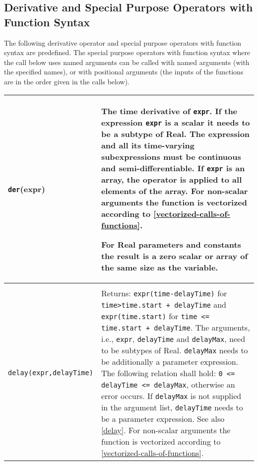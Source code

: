 \subsection{Derivative and Special Purpose Operators with Function Syntax}

The following derivative operator and special purpose operators with
function syntax are predefined. The special purpose operators with
function syntax where the call below uses named arguments can be called
with named arguments (with the specified names), or with positional
arguments (the inputs of the functions are in the order given in the
calls below).

\begin{longtable}{|p{5.1cm}|p{8cm}|}
\hline \endhead

\lstinline!der!(expr) &
The time derivative of \lstinline!expr!. If the expression \lstinline!expr! is a
scalar it needs to be a subtype of Real. The expression and all its
time-varying subexpressions must be continuous and semi-differentiable.
If \lstinline!expr! is an array, the operator
is applied to all elements of the array. For non-scalar arguments the
function is vectorized according to \autoref{vectorized-calls-of-functions}.
\par
\begin{nonnormative*}
For Real parameters and constants the result is a zero scalar or array of the same size as the variable.
\end{nonnormative*}
\\
\hline

\begin{tabular}{@{}p{5.1cm}@{}}

\lstinline!delay(expr,delayTime,delayMax)!\\
\lstinline!delay(expr,delayTime)!
\end{tabular} &
Returns: \lstinline!expr(time-delayTime)! for \lstinline!time>time.start + delayTime! and \lstinline!expr(time.start)! for \lstinline!time <= time.start + delayTime!. The arguments, i.e., \lstinline!expr!, \lstinline!delayTime! and \lstinline!delayMax!, need to be
subtypes of Real. \lstinline!delayMax! needs to be additionally a parameter
expression. The following relation shall hold: \lstinline!0 <= delayTime <= delayMax!, otherwise an error occurs. If \lstinline!delayMax! is not
supplied in the argument list, \lstinline!delayTime! needs to be a parameter
expression. See also \autoref{delay}. For non-scalar arguments the
function is vectorized according to \autoref{vectorized-calls-of-functions}.\\
\hline


\end{longtable}
